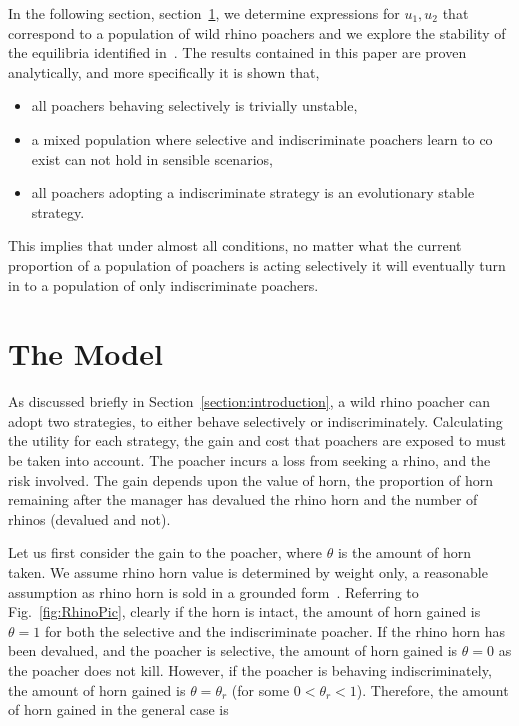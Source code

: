 \documentclass[10pt]{article}
\begin{document}
In the following section, section~\ref{section:the_model}, we determine expressions
for \(u_1, u_2\) that correspond to a population of wild rhino poachers and we
explore the stability of the equilibria identified in~\cite{Lee}. The results
contained in this paper are proven analytically, and more specifically it is 
shown that,

\begin{itemize}
	\item all poachers behaving selectively is trivially unstable,  
	\item a mixed population where selective and indiscriminate poachers
	learn to co exist can not hold in sensible scenarios,
	\item all poachers adopting a indiscriminate strategy is an evolutionary 
	stable strategy.
\end{itemize}

This implies that under almost all conditions, no matter what the current proportion of
a population of poachers is acting selectively it will eventually turn in to a population
of only indiscriminate poachers.
\section{The Model}\label{section:the_model}

As discussed briefly in Section~\ref{section:introduction}, a wild rhino poacher
can adopt two strategies, to either behave selectively
or indiscriminately. Calculating the utility for each strategy, the gain and cost
that poachers are exposed to must be taken into account. The poacher incurs a
loss from seeking a rhino, and the risk involved. The gain depends upon the value
of horn, the proportion of horn remaining after the manager has devalued the 
rhino horn and the number of rhinos (devalued and not).

Let us first consider the gain to the poacher, where \(\theta\) is the amount of 
horn taken. We assume rhino horn value is determined by weight only, a 
reasonable assumption as rhino horn is sold in a grounded form~\cite{Saverhino}.
Referring to Fig.~\ref{fig:RhinoPic}, clearly if the horn is intact, the amount of
horn gained is \(\theta=1\) for both the selective and the indiscriminate poacher.
If the rhino horn has been devalued, and the poacher is selective, the amount of horn 
gained is \(\theta=0\) as the poacher does not kill. However, if the poacher is 
behaving indiscriminately, the amount of horn gained is \(\theta = \theta_r\)
(for some \(0<\theta_r<1\)). 
Therefore, the amount of horn gained in the general case is
\end{document}
